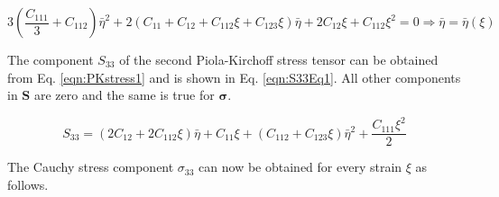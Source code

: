 \documentclass[showpacs,aps,floatfix,prb,reprint,superscriptaddress,onecolumn]{revtex4-1}
\begin{document}
\begin{equation}
\label{eqn:cubicexpansion4} 
3 \left(\frac{C_{111}}{3} + C_{112}\right) \bar{\eta}^{2} + 2 \left(C_{11} + C_{12} + C_{112} \xi + C_{123} \xi \right) \bar{\eta} + 2 C_{12} \xi + C_{112} \xi^{2} = 0 \Rightarrow \bar{\eta} = \bar{\eta} \left(\xi\right)
\end{equation}

The component $S_{33}$ of the second Piola-Kirchoff stress tensor can be obtained from Eq. \ref{eqn:PKstress1} and is shown in Eq. \ref{eqn:S33Eq1}. All other components in $\mathbf{S}$ are zero and the same is true for $\mathbf{\sigma}$.

\begin{equation}
\label{eqn:S33Eq1} 
S_{33} = \left(2 C_{12} + 2 C_{112} \xi \right) \bar{\eta} + C_{11} \xi + \left(C_{112} + C_{123} \xi \right) \bar{\eta}^{2} + \frac{C_{111} \xi^{2}}{2}
\end{equation}

The Cauchy stress component $\sigma_{33}$ can now be obtained for every strain $\xi$ as follows.
\end{document}
